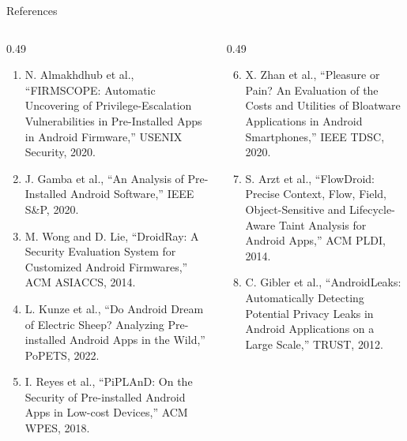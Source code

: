 \documentclass[aspectratio=169,10pt]{beamer}
\begin{document}
\begin{frame}{References}

\tiny

\begin{columns}[T]

\begin{column}{0.49\textwidth}

\begin{enumerate}

    \item N. Almakhdhub et al., ``FIRMSCOPE: Automatic Uncovering of Privilege-Escalation Vulnerabilities in Pre-Installed Apps in Android Firmware,'' USENIX Security, 2020.

    \item J. Gamba et al., ``An Analysis of Pre-Installed Android Software,'' IEEE S\&P, 2020.

    \item M. Wong and D. Lie, ``DroidRay: A Security Evaluation System for Customized Android Firmwares,'' ACM ASIACCS, 2014.

    \item L. Kunze et al., ``Do Android Dream of Electric Sheep? Analyzing Pre-installed Android Apps in the Wild,'' PoPETS, 2022.

    \item I. Reyes et al., ``PiPLAnD: On the Security of Pre-installed Android Apps in Low-cost Devices,'' ACM WPES, 2018.

\end{enumerate}

\end{column}

\begin{column}{0.49\textwidth}

\begin{enumerate}
\setcounter{enumi}{5}

    \item X. Zhan et al., ``Pleasure or Pain? An Evaluation of the Costs and Utilities of Bloatware Applications in Android Smartphones,'' IEEE TDSC, 2020.

    \item S. Arzt et al., ``FlowDroid: Precise Context, Flow, Field, Object-Sensitive and Lifecycle-Aware Taint Analysis for Android Apps,'' ACM PLDI, 2014.

    \item C. Gibler et al., ``AndroidLeaks: Automatically Detecting Potential Privacy Leaks in Android Applications on a Large Scale,'' TRUST, 2012.


\end{enumerate}
\end{column}
\end{columns}
\end{frame}
\end{document}
